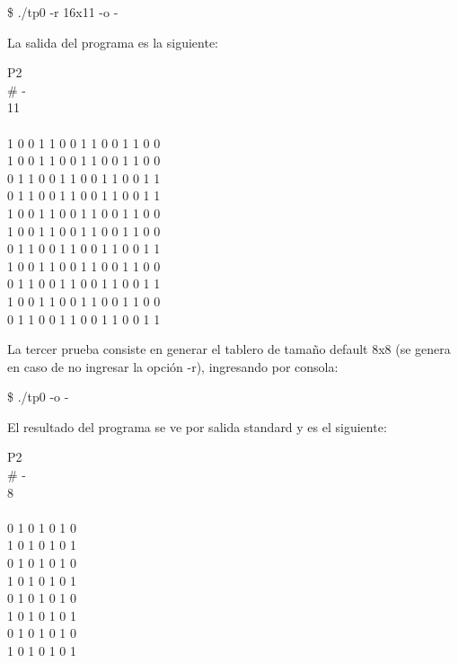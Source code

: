 \documentclass{article}
\begin{document}
{\ttfamily\footnotesize
\indent \$ ./tp0 -r 16x11 -o -\\}
\smallskip

	La salida del programa es la siguiente:
	\bigskip

{\ttfamily\footnotesize
	\indent P2 \\
	\indent \# - \\
	 11 \\
	 \\
	 1 0 0 1 1 0 0 1 1 0 0 1 1 0 0 \\
	 1 0 0 1 1 0 0 1 1 0 0 1 1 0 0 \\
	 0 1 1 0 0 1 1 0 0 1 1 0 0 1 1 \\
	 0 1 1 0 0 1 1 0 0 1 1 0 0 1 1 \\
	 1 0 0 1 1 0 0 1 1 0 0 1 1 0 0 \\
	 1 0 0 1 1 0 0 1 1 0 0 1 1 0 0 \\
	 0 1 1 0 0 1 1 0 0 1 1 0 0 1 1 \\
	 1 0 0 1 1 0 0 1 1 0 0 1 1 0 0 \\
	 0 1 1 0 0 1 1 0 0 1 1 0 0 1 1 \\
	 1 0 0 1 1 0 0 1 1 0 0 1 1 0 0 \\
	 0 1 1 0 0 1 1 0 0 1 1 0 0 1 1 \\
}
\bigskip


	La tercer prueba consiste en generar el tablero de tamaño default 8x8 (se genera en caso de no ingresar la opción -r), ingresando por consola:
	\bigskip

{\ttfamily\footnotesize
\indent \$ ./tp0 -o -\\}
\smallskip

	El resultado del programa se ve por salida standard y es el siguiente:
	\bigskip

{\ttfamily\footnotesize
	\indent P2 \\
	\indent \# - \\
	 8 \\
	 \\
	 0 1 0 1 0 1 0 \\
	 1 0 1 0 1 0 1 \\
	 0 1 0 1 0 1 0 \\
	 1 0 1 0 1 0 1 \\
	 0 1 0 1 0 1 0 \\
	 1 0 1 0 1 0 1 \\
	 0 1 0 1 0 1 0 \\
	 1 0 1 0 1 0 1 \\
}
\bigskip
\end{document}
